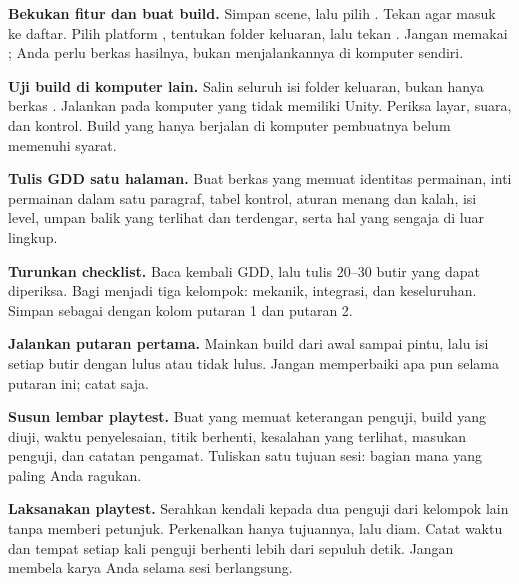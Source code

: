 \begin{langkah}
  \item \textbf{Bekukan fitur dan buat build.} Simpan scene, lalu pilih
        . Tekan  agar
         masuk ke daftar. Pilih platform ,
        tentukan folder keluaran, lalu tekan . Jangan memakai
        ; Anda perlu berkas hasilnya, bukan menjalankannya
        di komputer sendiri.

  \item \textbf{Uji build di komputer lain.} Salin seluruh isi folder keluaran,
        bukan hanya berkas . Jalankan pada komputer yang tidak
        memiliki Unity. Periksa layar, suara, dan kontrol. Build yang hanya
        berjalan di komputer pembuatnya belum memenuhi syarat.

  \item \textbf{Tulis GDD satu halaman.} Buat berkas  yang memuat
        identitas permainan, inti permainan dalam satu paragraf, tabel kontrol,
        aturan menang dan kalah, isi level, umpan balik yang terlihat dan
        terdengar, serta hal yang sengaja di luar lingkup.

  \item \textbf{Turunkan checklist.} Baca kembali GDD, lalu tulis 20--30 butir
        yang dapat diperiksa. Bagi menjadi tiga kelompok: mekanik, integrasi,
        dan keseluruhan. Simpan sebagai  dengan
        kolom putaran 1 dan putaran 2.

  \item \textbf{Jalankan putaran pertama.} Mainkan build dari awal sampai
        pintu, lalu isi setiap butir dengan lulus atau tidak lulus. Jangan
        memperbaiki apa pun selama putaran ini; catat saja.

  \item \textbf{Susun lembar playtest.} Buat  yang
        memuat keterangan penguji, build yang diuji, waktu penyelesaian, titik
        berhenti, kesalahan yang terlihat, masukan penguji, dan catatan
        pengamat. Tuliskan satu tujuan sesi: bagian mana yang paling Anda
        ragukan.

  \item \textbf{Laksanakan playtest.} Serahkan kendali kepada dua penguji dari
        kelompok lain tanpa memberi petunjuk. Perkenalkan hanya tujuannya,
        lalu diam. Catat waktu dan tempat setiap kali penguji berhenti lebih
        dari sepuluh detik. Jangan membela karya Anda selama sesi berlangsung.


\end{langkah}
